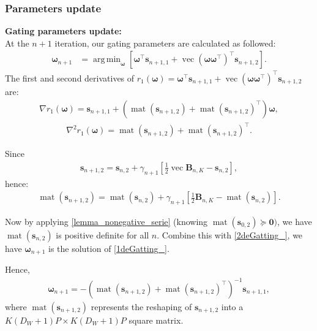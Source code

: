 \documentclass{article}
\newcommand{\zero}{\ensuremath{\mathbf{0}}}
\DeclareMathOperator*{\vect}{vec} %
\DeclareMathOperator*{\mat}{mat}
\def\vomega{{\bm{\omega}}}
\def\vs{{\bm{s}}}
\def\mB{{\bm{B}}}
\DeclareMathOperator*{\argmin}{arg\,min}
\begin{document}
\subsubsection{Parameters update}\label{Paramupdate for SGMLMoE}
\textbf{Gating parameters update:}\\
At the $n+1$ iteration, our gating parameters are calculated as followed:
\begin{align*}
    \vomega_{n+1}&=\displaystyle\argmin_{\vomega}\left[\vomega^{\top}\vs_{n+1,1}+\vect(\vomega\vomega^{\top})^{\top}\vs_{n+1,2}\right].
\end{align*}
The first and second derivatives of $r_1(\vomega)=\vomega^{\top}\vs_{n+1,1}+\vect(\vomega\vomega^{\top})^{\top}\vs_{n+1,2}$ are:
\begin{align} \label{1deGatting_}
   \nabla r_1(\vomega)=\vs_{n+1,1}+(\mat(\vs_{n+1,2})+\mat(\vs_{n+1,2})^{\top})\vomega,
\end{align}
\begin{align} \label{2deGatting_}
   \nabla^2 r_1(\vomega)=\mat(\vs_{n+1,2})+\mat(\vs_{n+1,2})^{\top}.
\end{align}
\par Since
\begin{align*}
    \vs_{n+1,2}=\vs_{n,2}+\gamma_{n+1}\left[\frac{1}{2}\vect\mB_{n,K}-\vs_{n,2}\right],
\end{align*}
hence:
\begin{align*}
    \mat(\vs_{n+1,2})=\mat(\vs_{n,2})+\gamma_{n+1}\left[\frac{1}{2}\mB_{n,K}-\mat(\vs_{n,2})\right].
\end{align*}
\par Now by applying \cref{lemma_nonegative_serie} (knowing $\mat(\vs_{0,2})\succeq \zero)$, we have $\mat(\vs_{n,2})$ is positive definite for all $n$. Combine this with \cref{2deGatting_}, we have $\vomega_{n+1}$ is the solution of \cref{1deGatting_}.

Hence,
\begin{align*}
\vomega_{n+1} = -\left(\mat(\vs_{n+1,2}) + \mat(\vs_{n+1,2})^{\top}\right)^{-1} \vs_{n+1,1},
\end{align*}
where $\mat(\vs_{n+1,2})$ represents the reshaping of $\vs_{n+1,2}$ into a $K(D_W+1)P \times K(D_W+1)P$ square matrix.
\end{document}
